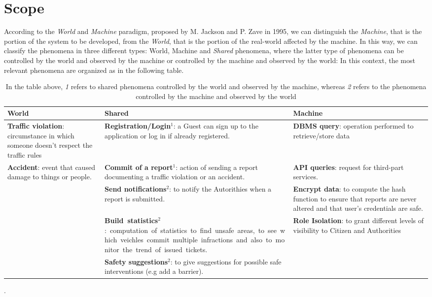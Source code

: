 \documentclass{report}
\begin{document}
\section{Scope}
According to the \textit{World} and \textit{Machine} paradigm, proposed by M. Jackson and P. Zave in 1995, we can distinguish the \textit{Machine}, that is the portion of the system to be developed, from the \textit{World}, that is the portion of the real-world affected by the machine. In this way, we can classify the phenomena in three different types: World, Machine and \textit{Shared} phenomena, where the latter type of phenomena can be controlled by the world and observed by the machine or controlled by the machine and observed by the world:
\newline
In this context, the most relevant phenomena are organized as in the following table.
\clearpage
\begin{table}[p]
		\begin{center}
		\begin{tabular}{|C{.28\textwidth}||C{.28\textwidth}||C{.28\textwidth}|}
			\toprule
			\textbf{World} &\textbf{Shared}& \textbf{Machine}\\
			\midrule
			\midrule
			\textbf{Traffic violation}: circumstance in which someone doesn't respect the traffic rules &\textbf{\small{Registration/Login}}$^{1}$: a Guest can sign up to the application or log in if already registered.&\textbf{DBMS query}: operation performed to retrieve/store data\\
			\midrule
			\textbf{Accident}: event that caused damage to things or people.&\textbf{Commit of a report}$^{1}$: action of sending a report documenting a traffic violation or an accident.&\textbf{API queries}: request for third-part services.\\
			\midrule
			&\textbf{Send notifications}$^{2}$: to notify the Autorithies when a report is submitted.&\textbf{Encrypt data}: to compute the hash function to ensure that reports are never altered and that user's credentials are safe.\\
			\midrule
			&\textbf{Build statistics}$^{2}$: computation of statistics to find unsafe areas, to see which veichles commit multiple infractions and also to monitor the trend of issued tickets.&\textbf{Role Isolation}: to grant different levels of visibility to Citizen and Authorities\\ 
			\midrule			
			&\textbf{Safety suggestions}$^{2}$: to give suggestions for possible safe interventions (e.g add a barrier).&\\
			\bottomrule
		\end{tabular}
		\end{center}
		\caption{In the table above, \textit{1} refers to shared phenomena controlled by the world and observed by the machine, whereas \textit{2} refers to the phenomena controlled by the machine and observed by the world}.
		\label{tab:multicol}
	\end{table}
\end{document}
